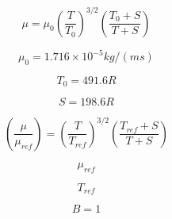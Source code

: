 

\begin{equation}
\mu = \mu_0 \left( \frac{T}{T_0} \right)^{3/2} \left(
\frac{T_0 + S}{T+S} \right)
\end{equation}

\begin{equation}
\mu_0 = 1.716 \times 10^{-5} kg/(ms)
\end{equation}

\begin{equation}
T_0 = 491.6 R
\end{equation}

\begin{equation}
S = 198.6 R
\end{equation}

\begin{equation}
\left( \frac{\mu}{\mu_{ref}} \right) = \left( \frac{T}{T_{ref}} \right)^{3/2} \left(
\frac{T_{ref} + S}{T+S} \right)
\end{equation}

\begin{equation}
\mu_{ref}
\end{equation}

\begin{equation}
T_{ref}
\end{equation}

\begin{equation}
B=1
\end{equation}


